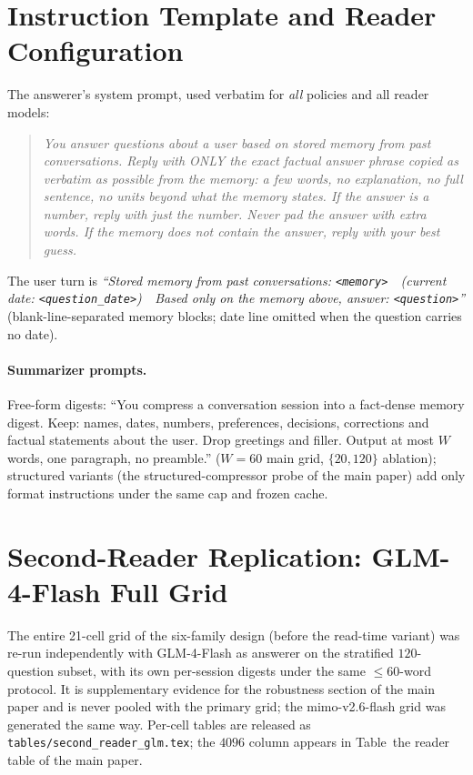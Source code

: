 \documentclass{article} %
\begin{document}
\section{Instruction Template and Reader Configuration}
\label{app:template}
The answerer's system prompt, used verbatim for \emph{all} policies and all reader models:

\begin{quote}\footnotesize\itshape
You answer questions about a user based on stored memory from past conversations. Reply with
ONLY the exact factual answer phrase copied as verbatim as possible from the memory: a few
words, no explanation, no full sentence, no units beyond what the memory states. If the
answer is a number, reply with just the number. Never pad the answer with extra words. If the
memory does not contain the answer, reply with your best guess.
\end{quote}

The user turn is \emph{``Stored memory from past conversations: \texttt{<memory>}\ \ (current
date: \texttt{<question\_date>})\ \ Based only on the memory above, answer:
\texttt{<question>}''} (blank-line-separated memory blocks; date line omitted when the
question carries no date).

\paragraph{Summarizer prompts.} Free-form digests: ``You compress a conversation session into
a fact-dense memory digest. Keep: names, dates, numbers, preferences, decisions, corrections
and factual statements about the user. Drop greetings and filler. Output at most $W$ words,
one paragraph, no preamble.'' ($W{=}60$ main grid, $\{20,120\}$ ablation); structured variants
(the structured-compressor probe of the main paper) add only format instructions under the same cap and frozen cache.

\section{Second-Reader Replication: GLM-4-Flash Full Grid}
\label{app:secondreader}
The entire 21-cell grid of the six-family design (before the read-time variant) was re-run
independently with GLM-4-Flash as answerer on the stratified $120$-question subset, with its
own per-session digests under the same $\leq$60-word protocol. It is supplementary evidence
for the robustness section of the main paper and is never pooled with the primary grid; the mimo-v2.6-flash grid was
generated the same way. Per-cell tables are released as
\texttt{tables/second\_reader\_glm.tex}; the $4096$ column appears in Table~the reader table of the main paper.
\end{document}
